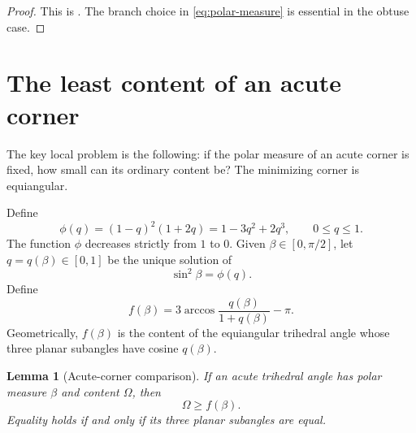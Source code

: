\documentclass[11pt,a4paper]{article}
\newtheorem{lemma}[theorem]{Lemma}
\theoremstyle{definition}
\theoremstyle{remark}
\begin{document}
\begin{proof}
This is \cite[Theorem~1(b), Section~5]{HajjaHammoudeh2014}.  The branch
choice in \eqref{eq:polar-measure} is essential in the obtuse case.
\end{proof}

\section{The least content of an acute corner}\label{sec:acute-corner}

The key local problem is the following: if the polar measure of an acute
corner is fixed, how small can its ordinary content be?  The minimizing
corner is equiangular.

Define
\begin{equation}\label{eq:phi}
 \phi(q)=(1-q)^2(1+2q)=1-3q^2+2q^3,
 \qquad 0\leq q\leq1.
\end{equation}
The function $\phi$ decreases strictly from $1$ to $0$.  Given
$\beta\in[0,\pi/2]$, let $q=q(\beta)\in[0,1]$ be the unique solution of
\begin{equation}\label{eq:q-beta}
 \sin^2\beta=\phi(q).
\end{equation}
Define
\begin{equation}\label{eq:def-f}
 f(\beta)=3\arccos\frac{q(\beta)}{1+q(\beta)}-\pi.
\end{equation}
Geometrically, $f(\beta)$ is the content of the equiangular trihedral angle
whose three planar subangles have cosine $q(\beta)$.

\begin{lemma}[Acute-corner comparison]\label{lem:acute-corner}
If an acute trihedral angle has polar measure $\beta$ and content $\Omega$,
then
\begin{equation}\label{eq:acute-comparison}
 \Omega\geq f(\beta).
\end{equation}
Equality holds if and only if its three planar subangles are equal.
\end{lemma}
\end{document}
